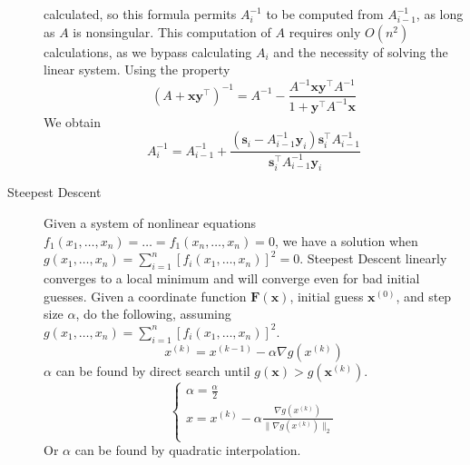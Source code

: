 \documentclass[8pt]{article}
\begin{document}
\begin{multicols}{2}
\begin{description}
    calculated, so this formula permits $A_i^{-1}$ to be computed from $A_{i-1}^{-1}$, as long as
    $A$ is nonsingular. This computation of $A$ requires only $O(n^2)$ calculations, as we bypass
    calculating $A_i$ and the necessity of solving the linear system. Using the property
    $$\left(A+\mathbf{x}\mathbf{y}^\top\right)^{-1} = A^{-1} - \frac{A^{-1}\mathbf{x}\mathbf{y}^\top A^{-1}}{1+\mathbf{y}^\top A^{-1}\mathbf{x}}$$
    We obtain
    $$A_i^{-1}= A_{i-1}^{-1}+\frac{(\mathbf{s}_i - A_{i-1}^{-1}\mathbf{y}_i)\mathbf{s}_i^\top A_{i-1}^{-1}}{\mathbf{s}_i^\top A_{i-1}^{-1} \mathbf{y}_i}$$
  \item[Steepest Descent] Given a system of nonlinear equations
    $f_1(x_1,\ldots,x_n)=\ldots=f_1(x_n,\ldots,x_n)=0$, we have a solution when $g(x_1,\ldots,x_n)
    = \sum_{i=1}^n[f_i(x_1,\ldots,x_n)]^2=0$. Steepest Descent linearly converges to a local
    minimum and will converge even for bad initial guesses. Given a coordinate function
    $\mathbf{F}(\mathbf{x})$, initial guess $\mathbf{x}^{(0)}$, and step size $\alpha$, do the
    following, assuming $g(x_1,\ldots,x_n) = \sum_{i=1}^n[f_i(x_1,\ldots,x_n)]^2$.
    \begin{equation*}
      x^{(k)}=x^{(k-1)}-\alpha \nabla g(x^{(k)})
    \end{equation*}
    $\alpha$ can be found by direct search until $g(\mathbf{x}) > g(\mathbf{x}^{(k)})$.
    \begin{equation*}
      \left\{
        \begin{array}{c}
          \alpha = \frac{\alpha}{2} \\
          x = x^{(k)} - \alpha \frac{\nabla g(x^{(k)})}{\|\nabla g(x^{(k)})\|_2} \\
        \end{array}
      \right.
    \end{equation*}
    Or $\alpha$ can be found by quadratic interpolation.


\end{description}
\end{multicols}
\end{document}
